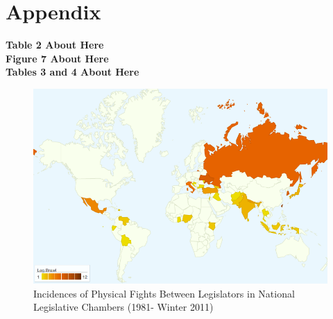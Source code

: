 \documentclass[a4paper]{article}\usepackage{graphicx, color}
\begin{document}

\section*{Appendix}

\begin{center}

    {\bf{Table 2 About Here}} \\
    {\bf{Figure 7 About Here}} \\
    {\bf{Tables 3 and 4 About Here}}

\end{center}







\theendnotes


\begin{figure}[h!]
    \centering
    \caption{Incidences of Physical Fights Between Legislators in National Legislative Chambers (1981- Winter 2011)}
    \label{leg_map}
        \includegraphics[width = 13cm]{incidence_map.png}
\end{figure}
\end{document}
